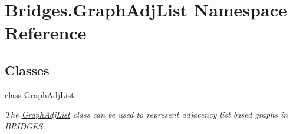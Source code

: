 \hypertarget{namespace_bridges_1_1_graph_adj_list}{}\section{Bridges.\+Graph\+Adj\+List Namespace Reference}
\label{namespace_bridges_1_1_graph_adj_list}
\subsection*{Classes}
\begin{DoxyCompactItemize}
\item 
class \hyperlink{class_bridges_1_1_graph_adj_list_1_1_graph_adj_list}{Graph\+Adj\+List}
\begin{DoxyCompactList}\small\item\em The \hyperlink{class_bridges_1_1_graph_adj_list_1_1_graph_adj_list}{Graph\+Adj\+List} class can be used to represent adjacency list based graphs in B\+R\+I\+D\+G\+E\+S. \end{DoxyCompactList}\end{DoxyCompactItemize}
